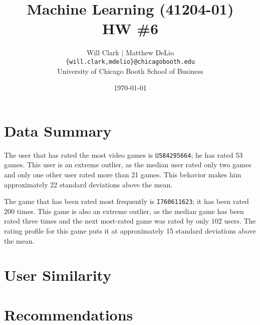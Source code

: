 



\title{Machine Learning (41204-01)\\HW \#6}
\author{Will Clark $\vert$ Matthew DeLio \\
\texttt{\{will.clark,mdelio\}@chicagobooth.edu} \\
University of Chicago Booth School of Business}
\date{\today}
\maketitle

\section{Data Summary}

The user that has rated the most video games is \texttt{U584295664}; he has rated 53 games. This user is an extreme outlier, as the median user rated only two games and only one other user rated more than 21 games. This behavior makes him approximately 22 standard deviations above the mean.

The game that has been rated most frequently is \texttt{I760611623}; it has been rated 200 times. This game is also an extreme outlier, as the median game has been rated three times and the next most-rated game was rated by only 102 users. The rating profile for this game puts it at approximately 15 standard deviations above the mean.

\section{User Similarity}

\section{Recommendations}

\begin{appendices}

\clearpage

%

\end{appendices}



